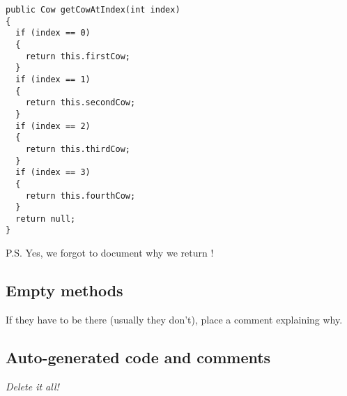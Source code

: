 \begin{lstlisting}
public Cow getCowAtIndex(int index)
{
  if (index == 0)
  {
    return this.firstCow;
  }
  if (index == 1)
  {
    return this.secondCow;
  }
  if (index == 2)
  {
    return this.thirdCow;
  }
  if (index == 3)
  {
    return this.fourthCow;
  }
  return null;
}
\end{lstlisting}

P.S. Yes, we forgot to document why we return !

\subsection{Empty methods}

If they have to be there (usually they don't), place a comment explaining why.

\subsection{Auto-generated code and comments}

\emph{Delete it all!}
